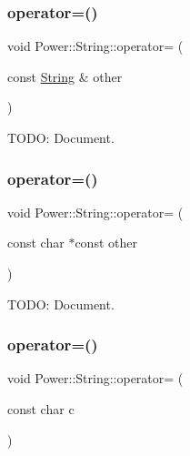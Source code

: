 \subsubsection{\texorpdfstring{operator=()}{operator=()}\hspace{0.1cm}{\footnotesize\ttfamily [1/3]}}
{\footnotesize\ttfamily void Power\+::\+String\+::operator= (\begin{DoxyParamCaption}\item[{const \hyperlink{class_power_1_1_string}{String} \&}]{other }\end{DoxyParamCaption})\hspace{0.3cm}{\ttfamily [inline]}}



T\+O\+DO\+: Document. 

\mbox{\label{class_power_1_1_string_abf5f2db360bf2c1853bccfcc8e2d3225}} 
\subsubsection{\texorpdfstring{operator=()}{operator=()}\hspace{0.1cm}{\footnotesize\ttfamily [2/3]}}
{\footnotesize\ttfamily void Power\+::\+String\+::operator= (\begin{DoxyParamCaption}\item[{const char $\ast$const}]{other }\end{DoxyParamCaption})\hspace{0.3cm}{\ttfamily [inline]}}



T\+O\+DO\+: Document. 

\mbox{\label{class_power_1_1_string_afca363999008481eb546192d24f8c9c1}} 
\subsubsection{\texorpdfstring{operator=()}{operator=()}\hspace{0.1cm}{\footnotesize\ttfamily [3/3]}}
{\footnotesize\ttfamily void Power\+::\+String\+::operator= (\begin{DoxyParamCaption}\item[{const char}]{c }\end{DoxyParamCaption})\hspace{0.3cm}{\ttfamily [inline]}}



